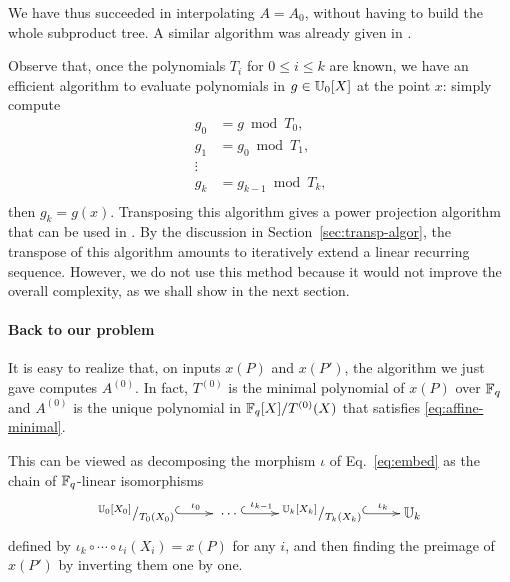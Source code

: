 We have thus succeeded in interpolating $A=A_0$, without having to
build the whole subproduct tree. A similar algorithm was already given
in \cite{enge+morain03}.


\begin{remark}
  Observe that, once the polynomials $T_i$ for $0\le i\le k$ are
  known, we have an efficient algorithm to evaluate polynomials in
  $g\in\mathbb{U}_0[X]$ at the point $x$: simply compute
  \begin{equation}
    \label{eq:191}
    \begin{aligned}
      g_0 &= g\bmod T_0\text{,}\\
      g_1 &= g_0\bmod T_1\text{,}\\
      \vdots\\
      g_k &= g_{k-1}\bmod T_k\text{,}\\
    \end{aligned}
  \end{equation}
  then $g_k=g(x)$. Transposing this algorithm gives a power projection
  algorithm that can be used in . By the discussion in
  Section~\ref{sec:transp-algor}, the transpose of this algorithm
  amounts to iteratively extend a linear recurring sequence. However,
  we do not use this method because it would not improve the overall
  complexity, as we shall show in the next section.
\end{remark}


\paragraph{Back to our problem}
It is easy to realize that, on inputs $x(P)$ and $x(P')$, the
algorithm we just gave computes $A^{(0)}$. In fact, $T^{(0)}$ is
the minimal polynomial of $x(P)$ over $\mathbb{F}_q$ and $A^{(0)}$ is the
unique polynomial in $\mathbb{F}_q[X]/T^{(0)}(X)$ that satisfies
\eqref{eq:affine-minimal}.

This can be viewed as decomposing the morphism $\iota$ of
Eq.~\eqref{eq:embed} as the chain of $\mathbb{F}_q$-linear isomorphisms
\begin{equation}
  \xymatrix{
    ^{\U_0[X_0]}/_{T_0(X_0)} \ar@{^{(}->}[r]^-{\iota_0} &
    \;\cdots\; \ar@{^{(}->}[r]^-{\iota_{k-1}} &
    ^{\U_k[X_k]}/_{T_k(X_k)} \ar@{^{(}->}[r]^-{\iota_k} &
    \U_k
  }
\end{equation}
defined by $\iota_k\circ\cdots\circ\iota_i(X_i) = x(P)$ for any $i$,
and then finding the preimage of $x(P')$ by inverting them one by
one.

